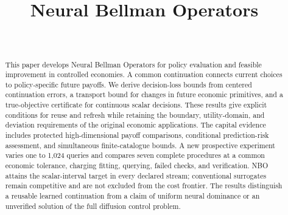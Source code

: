 \documentclass[ecta,nameyear,draft]{econsocart}
\theoremstyle{definition}
\theoremstyle{remark}
\begin{document}
\begin{frontmatter}
\title{Neural Bellman Operators}
\begin{aug}
\author[id=au1,addressref={add1}]{~}
\address[id=add1]{Peking University}
\end{aug}
\begin{abstract}
This paper develops Neural Bellman Operators for policy evaluation and feasible
improvement in controlled economies. A common continuation connects current
choices to policy-specific future payoffs. We derive decision-loss bounds from
centered continuation errors, a transport bound for changes in future economic
primitives, and a true-objective certificate for continuous scalar decisions.
These results give explicit conditions for reuse and refresh while retaining
the boundary, utility-domain, and deviation requirements of the original
economic applications. The capital evidence includes protected high-dimensional
payoff comparisons, conditional prediction-risk assessment, and simultaneous
finite-catalogue bounds. A new prospective experiment varies one to 1,024
queries and compares seven complete procedures at a common economic tolerance,
charging fitting, querying, failed checks, and verification. NBO attains the
scalar-interval target in every declared stream; conventional surrogates remain
competitive and are not excluded from the cost frontier. The results distinguish
a reusable learned continuation from a claim of uniform neural dominance or
an unverified solution of the full diffusion control problem.
\end{abstract}
\begin{keyword}
\end{keyword}
\end{frontmatter}









\end{document}
